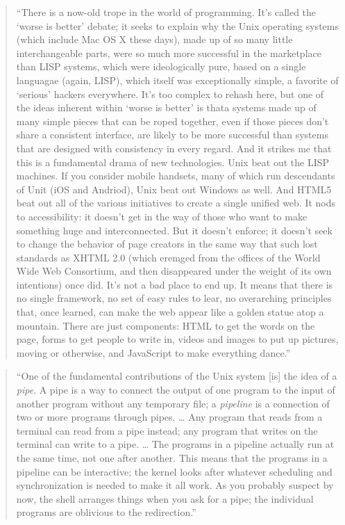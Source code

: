 \documentclass[]{tufte-book}
\begin{document}
\begin{quote}
``There is a now-old trope in the world of programming. It's called the `worse is
better' debate; it seeks to explain why the Unix operating systems (which include
Mac OS X these days), made up of so many little interchangeable parts, were so much
more successful in the marketplace than LISP systems, which were ideologically pure,
based on a single languagae (again, LISP), which itself was exceptionally simple,
a favorite of `serious' hackers everywhere. It's too complex to rehash here, but one
of the ideas inherent within `worse is better' is thata systems made up of many
simple pieces that can be roped together, even if those pieces don't share a consistent
interface, are likely to be more successful than systems that are designed with consistency
in every regard. And it strikes me that this is a fundamental drama of new technologies.
Unix beat out the LISP machines. If you consider mobile handsets, many of which run
descendants of Unit (iOS and Andriod), Unix beat out Windows as well. And HTML5 beat out
all of the various initiatives to create a single unified web. It nods to accessibility:
it doesn't get in the way of those who want to make something huge and interconnected.
But it doesn't enforce; it doesn't seek to change the behavior of page creators in the
same way that such lost standards as XHTML 2.0 (which eremged from the offices of
the World Wide Web Consortium, and then disappeared under the weight of its own
intentions) once did. It's not a bad place to end up. It means that there is no
single framework, no set of easy rules to lear, no overarching principles that,
once learned, can make the web appear like a golden statue atop a mountain. There
are just components: HTML to get the words on the page, forms to get people to
write in, videos and images to put up pictures, moving or otherwise, and
JavaScript to make everything dance.'' \citep{ford2015on}
\end{quote}

\begin{quote}
``One of the fundamental contributions of the Unix system {[}is{]} the idea of a \emph{pipe}.
A pipe is a way to connect the output of one program to the input of another program
without any temporary file; a \emph{pipeline} is a connection of two or more programs through
pipes. \ldots{} Any program that reads from a terminal can read from a pipe instead; any program
that writes on the terminal can write to a pipe. \ldots{} The programs in a pipeline actually
run at the same time, not one after another. This means that the programs in a pipeline
can be interactive; the kernel looks after whatever scheduling and synchronization is needed
to make it all work. As you probably suspect by now, the shell arranges things when you
ask for a pipe; the individual programs are oblivious to the redirection.'' \citep{kernighan1984unix}
\end{quote}
\end{document}
